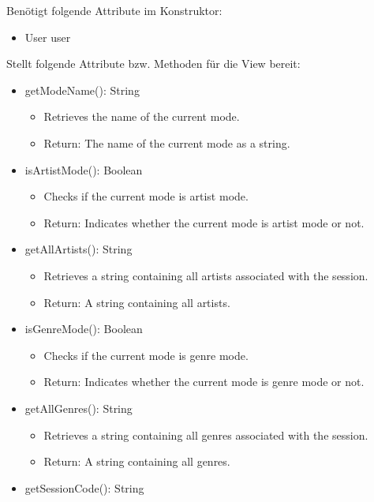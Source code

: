 \documentclass[oneside, ngerman]{sdqtechreport}
\begin{document}
Benötigt folgende Attribute im Konstruktor:
\begin{itemize}
    \item User user
\end{itemize}
Stellt folgende Attribute bzw. Methoden für die View bereit:
\begin{itemize}

    \item getModeName(): String
        \begin{itemize}
            \item Retrieves the name of the current mode.
            \item Return: The name of the current mode as a string.
        \end{itemize}
    \item isArtistMode(): Boolean
        \begin{itemize}
            \item Checks if the current mode is artist mode.
            \item Return: Indicates whether the current mode is artist mode or not.
        \end{itemize}
    \item getAllArtists(): String
        \begin{itemize}
            \item Retrieves a string containing all artists associated with the session.
            \item Return: A string containing all artists.
        \end{itemize}
    \item isGenreMode(): Boolean
        \begin{itemize}
            \item Checks if the current mode is genre mode.
            \item Return: Indicates whether the current mode is genre mode or not.
        \end{itemize}
    \item getAllGenres(): String
        \begin{itemize}
            \item Retrieves a string containing all genres associated with the session.
            \item Return: A string containing all genres.
        \end{itemize}
    \item getSessionCode(): String
        \begin{itemize}

\end{itemize}
\end{itemize}
\end{document}
